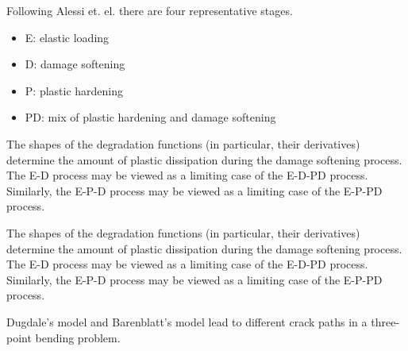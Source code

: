 \begin{frame}{}
Following Alessi et. el. there are four representative stages.
\begin{itemize}
  \item E: elastic loading
  \item D: damage softening
  \item P: plastic hardening
  \item PD: mix of plastic hardening and damage softening
\end{itemize}

\end{frame}

\begin{frame}{}
The shapes of the degradation functions (in particular, their derivatives) determine the amount of plastic dissipation during the damage softening process. \textcolor{dukeroyal}{The E-D process may be viewed as a limiting case of the E-D-PD process.} Similarly, the E-P-D process may be viewed as a limiting case of the E-P-PD process.

\end{frame}

\begin{frame}{}
The shapes of the degradation functions (in particular, their derivatives) determine the amount of plastic dissipation during the damage softening process. The E-D process may be viewed as a limiting case of the E-D-PD process. \textcolor{dukeroyal}{Similarly, the E-P-D process may be viewed as a limiting case of the E-P-PD process.}

\end{frame}

\begin{frame}{}
Dugdale's model and Barenblatt's model lead to different crack paths in a three-point bending problem.

\end{frame}
